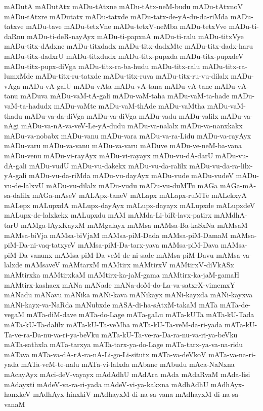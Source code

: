 {mADutA
mADutAtx
mADu-tAtxne
mADu-tAtx-neM-budu
mADu-tAtxnoV
mADu-tAtxre
mADutatx
mADu-tatxde
mADu-tatx-de-yA-du-da-riMda
mADu-tatxve
mADu-tave
mADu-tetxVne
mADu-tetxV-neMba
mADu-tetxVve
mADu-ti-daRnu
mADu-ti-deR-nayAyx
mADu-ti-papxnA
mADu-ti-ralu
mADu-titxVye
mADu-titx-dAdxne
mADu-titxdadx
mADu-titx-dadxMte
mADu-titx-dadx-haru
mADu-titx-dadxrU
mADu-titxdudx
mADu-titx-pupxda
mADu-titx-pupxdeV
mADu-titx-pupx-diVga
mADu-titx-ra-ba-hudu
mADu-titx-ralu
mADu-titx-ra-lumxMde
mADu-titx-ru-tatxde
mADu-titx-ruva
mADu-titx-ru-vu-dilalx
mADu-vAga
mADu-vA-galU
mADu-vAta
mADu-vA-tana
mADu-vA-tane
mADu-vA-tanu
mADuva
mADu-vaM-tA-gali
mADu-vaM-taha
mADu-vaM-ta-hade
mADu-vaM-ta-hadudx
mADu-vaMte
mADu-vaM-thAde
mADu-vaMtha
mADu-vaM-thadu
mADu-va-da-diVga
mADu-va-diVga
mADu-vadu
mADu-valilx
mADu-va-nAgi
mADu-va-nA-va-veV-Le-yA-dudu
mADu-va-nalalx
mADu-va-nanxkakx
mADu-va-nobabx
mADu-vanu
mADu-vara
mADu-va-ra-Lidu
mADu-va-rayAyx
mADu-varu
mADu-va-vanu
mADu-va-varu
mADuve
mADu-ve-neM-ba-vana
mADu-venu
mADu-vi-rayAyx
mADu-vi-rayayx
mADu-vu-dA-darU
mADu-vu-dA-gali
mADu-vudU
mADu-vu-dakekx
mADu-vu-da-ralilx
mADu-vu-da-ra-lilx-yA-gali
mADu-vu-da-riMda
mADu-vu-dayAyx
mADu-vude
mADu-vudeV
mADu-vu-de-lalxvU
mADu-vu-dilalx
mADu-vudu
mADu-vu-duMTu
mAGa
mAGa-mA-sa-dalilx
mAGa-mAseV
mALApx-taneV
mALapx
mALapx-ruMTe
mALekxyA
mALepx
mALupxdA
mALupx-dayAyx
mALupx-dayayx
mALupxde
mALupxdeV
mALupx-de-lalxkekx
mALupxdu
mAM
mAMda-Li-biR-lavx-patirx
mAMdhA-tarU
mAMga-lAyxKayxM
mAMgalayx
mAMsa
mAMsa-Ba-kaSxNa
mAMsaM
mAMsa-biVja
mAMsa-biVjaM
mAMsa-piM-Dada
mAMsa-piM-DamaM
mAMsa-piM-Da-ni-vaq-tatxyeV
mAMsa-piM-Da-tarx-yava
mAMsa-piM-Dava
mAMsa-piM-Da-vanunx
mAMsa-piM-Da-veM-de-ni-sade
mAMsa-piM-Davu
mAMsa-va-lalxde
mAMsaveV
mAMtarxM
mAMtirx
mAMtirxV
mAMtirxV-diVkASx
mAMtirxka
mAMtirxkaM
mAMtirx-ka-jaM-gama
mAMtirx-ka-jaM-gamaH
mAMtirx-kashacx
mANa
mANade
mANa-doM-do-La-va-satxrX-vimemxY
mANadu
mANavu
mANika
mANi-kava
mANikayx
mANi-kayxda
mANi-kayxva
mANi-kayx-va-NaRda
mANubxde
mASA-di-ha-sAtxM-takaM
mATa
mATa-de-vegaM
mATa-diM-dave
mATa-do-Lage
mATa-gaLu
mATa-kUTa
mATa-kU-Tada
mATa-kU-Ta-dalilx
mATa-kU-Ta-veMba
mATa-kU-Ta-veM-da-ri-yada
mATa-kU-Ta-ve-ra-Da-nu-va-ri-ya-beVku
mATa-kU-Ta-ve-ra-Da-ra-nu-va-ri-ya-beVku
mATa-sathxla
mATa-tarxya
mATa-tarx-ya-do-Lage
mATa-tarx-ya-va-na-ridu
mATava
mATa-va-dA-rA-ra-nA-Li-go-Li-situtx
mATa-va-deVkoV
mATa-va-na-ri-yada
mATa-veM-te-nalu
mATa-vi-lalxda
mAbane
mAbudu
mAca-NaNxna
mAcayAyx
mAci-deV-vayayx
mAdAdhU
mAdAra
mAda
mAdaRvaM
mAda-lisi
mAdayxti
mAdeV-va-ra-ri-yada
mAdeV-vi-ya-kakxna
mAdhAdhU
mAdhAyx-hanxkeV
mAdhAyx-hinxkiV
mAdhayxM-di-na-sa-vana
mAdhayxM-di-na-sa-vanaM
}
